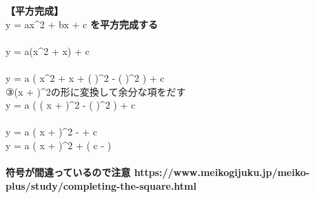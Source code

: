 \documentclass{article}
\begin{document}
\textbf{【平方完成】}\\
y = ax^2 + bx + c \textbf{を平方完成する}\\
\\
y = a(x^2 + x) + c\\
\\
y = a \left( x^2 + x + \left(  \right)^2 - \left(  \right)^2 \right) + c\\
{③(x + )^2の形に変換して余分な項をだす}\\
y = a \left( \left( x +  \right)^2 - \left(  \right)^2 \right) + c\\
\\
y = a \left( x +  \right)^2 -  + c\\
y = a \left( x +  \right)^2 + \left( c -  \right)\\
\\
\textbf{符号が間違っているので注意 https://www.meikogijuku.jp/meiko-plus/study/completing-the-square.html}
\end{document}
